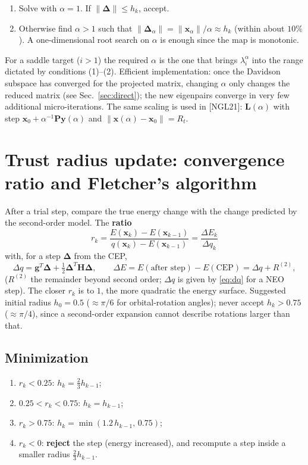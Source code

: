 \documentclass[11pt,a4paper]{article}
\newcommand{\bH}{\mathbf{H}}
\newcommand{\bL}{\mathbf{L}}
\newcommand{\bg}{\mathbf{g}}
\newcommand{\bx}{\mathbf{x}}
\newcommand{\bd}{\boldsymbol{\Delta}}
\newcommand{\bP}{\mathbf{P}}
\newcommand{\by}{\mathbf{y}}
\begin{document}
\begin{enumerate}[nosep]
 \item Solve with $\alpha=1$. If $\|\bd\|\le h_k$, accept.
 \item Otherwise find $\alpha>1$ such that $\|\bd_\alpha\|=\|\bx_\alpha\|/\alpha\approx h_k$ (within about $10\%$). A one-dimensional root search on $\alpha$ is enough since the map is monotonic.
\end{enumerate}
For a saddle target ($i>1$) the required $\alpha$ is the one that brings $\lambda^\alpha_i$ into the range dictated by conditions (1)--(2).
Efficient implementation: once the Davidson subspace has converged for the projected matrix, changing $\alpha$ only changes the reduced matrix (see Sec.~\ref{sec:direct}); the new eigenpairs converge in very few additional micro-iterations. The same scaling is used in [NGL21]: $\bL(\alpha)$ with step $\bx_0+\alpha^{-1}\bP\by(\alpha)$ and $\|\bx(\alpha)-\bx_0\|=R_t$.

\section{Trust radius update: convergence ratio and Fletcher's algorithm}\label{sec:ratio}
After a trial step, compare the true energy change with the change predicted by the second-order model. The \textbf{ratio}
\begin{equation}
 \boxed{\ r_k=\frac{E(\bx_k)-E(\bx_{k-1})}{q(\bx_k)-E(\bx_{k-1})}=\frac{\Delta E_k}{\Delta q_k}\ }
\end{equation}
with, for a step $\bd$ from the CEP,
\begin{equation}
 \Delta q=\bg^T\bd+\tfrac12\bd^T\bH\bd,\qquad \Delta E=E(\text{after step})-E(\text{CEP})=\Delta q+R^{(2)},
\end{equation}
($R^{(2)}$ the remainder beyond second order; $\Delta q$ is given by \eqref{eq:dq} for a NEO step). The closer $r_k$ is to $1$, the more quadratic the energy surface. Suggested initial radius $h_0=0.5$ ($\approx\pi/6$ for orbital-rotation angles); never accept $h_k>0.75$ ($\approx\pi/4$), since a second-order expansion cannot describe rotations larger than that.

\subsection{Minimization}
\begin{enumerate}[nosep,label=(\roman*)]
 \item $r_k<0.25$: $h_k=\tfrac23h_{k-1}$;
 \item $0.25<r_k<0.75$: $h_k=h_{k-1}$;
 \item $r_k>0.75$: $h_k=\min(1.2\,h_{k-1},\,0.75)$;
 \item $r_k<0$: \textbf{reject} the step (energy increased), and recompute a step inside a smaller radius $\tfrac23h_{k-1}$.
\end{enumerate}
\end{document}

